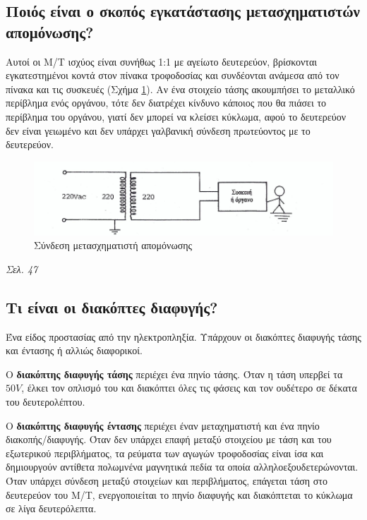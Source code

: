 \documentclass{article}
\begin{document}
\subsection{Ποιός είναι ο σκοπός εγκατάστασης μετασχηματιστών απομόνωσης?}
Αυτοί οι Μ/Τ ισχύος είναι συνήθως 1:1 με αγείωτο δευτερεύον, βρίσκονται εγκατεστημένοι κοντά στον πίνακα τροφοδοσίας και συνδέονται ανάμεσα από τον πίνακα και τις 
συσκευές (Σχήμα \ref{metasximatistisapomonwsis}). Αν ένα στοιχείο τάσης ακουμπήσει το μεταλλικό περίβλημα ενός οργάνου, τότε δεν διατρέχει κίνδυνο κάποιος που θα 
πιάσει το περίβλημα του οργάνου, γιατί δεν μπορεί να κλείσει κύκλωμα, αφού το δευτερεύον δεν είναι γειωμένο και δεν υπάρχει γαλβανική σύνδεση πρωτεύοντος με το 
δευτερεύον.  

\begin{figure}[h!]
    \includegraphics[width=\linewidth]{metasximatistisapomonwsis.png}
    \caption{Σύνδεση μετασχηματιστή απομόνωσης}
    \label{metasximatistisapomonwsis}
\end{figure}

\emph{Σελ. 47}

\subsection{Τι είναι οι διακόπτες διαφυγής?}
Ένα είδος προστασίας από την ηλεκτροπληξία. Υπάρχουν οι διακόπτες διαφυγής τάσης και έντασης ή αλλιώς διαφορικοί. 

O \textbf{διακόπτης διαφυγής τάσης} περιέχει ένα πηνίο τάσης. Όταν η τάση υπερβεί τα $50V$, έλκει τον οπλισμό του και διακόπτει όλες τις φάσεις και τον ουδέτερο σε
δέκατα του δευτερολέπτου.

O \textbf{διακόπτης διαφυγής έντασης} περιέχει έναν μεταχηματιστή και ένα πηνίο διακοπής/διαφυγής. Όταν δεν υπάρχει επαφή μεταξύ στοιχείου με τάση και του εξωτερικού
περιβλήματος, τα ρεύματα των αγωγών τροφοδοσίας είναι ίσα και δημιουργούν αντίθετα πολωμνένα  μαγνητικά πεδία τα οποία αλληλοεξουδετερώνονται. Όταν υπάρχει σύνδεση μεταξύ 
στοιχείων και περιβλήματος, επάγεται τάση στο δευτερεύον του M/T, ενεργοποιείται το πηνίο διαφυγής και διακόπτεται το κύκλωμα σε λίγα δευτερόλεπτα.
\end{document}
